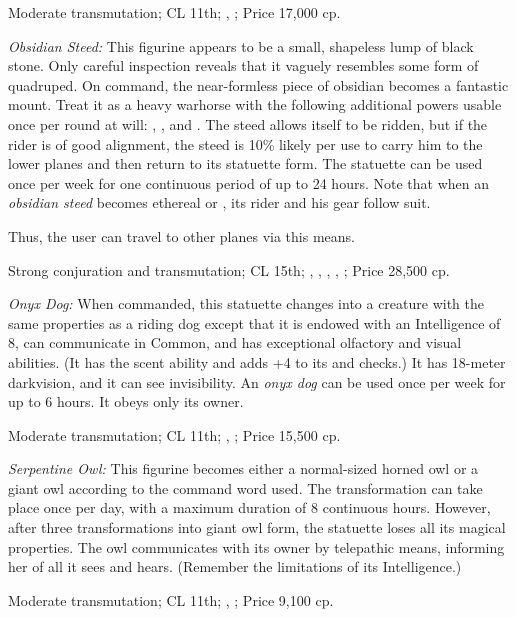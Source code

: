 Moderate transmutation; CL 11th; , ; Price 17,000 cp.

\textit{Obsidian Steed:} This figurine appears to be a small, shapeless lump of black stone. Only careful inspection reveals that it vaguely resembles some form of quadruped. On command, the near-formless piece of obsidian becomes a fantastic mount. Treat it as a heavy warhorse with the following additional powers usable once per round at will: , , and . The steed allows itself to be ridden, but if the rider is of good alignment, the steed is 10\% likely per use to carry him to the lower planes and then return to its statuette form. The statuette can be used once per week for one continuous period of up to 24 hours. Note that when an \emph{obsidian steed} becomes ethereal or , its rider and his gear follow suit.

Thus, the user can travel to other planes via this means.

Strong conjuration and transmutation; CL 15th; , , , , ; Price 28,500 cp.

\textit{Onyx Dog:} When commanded, this statuette changes into a creature with the same properties as a riding dog except that it is endowed with an Intelligence of 8, can communicate in Common, and has exceptional olfactory and visual abilities. (It has the scent ability and adds +4 to its  and  checks.) It has 18-meter darkvision, and it can see invisibility. An \emph{onyx dog} can be used once per week for up to 6 hours. It obeys only its owner.

Moderate transmutation; CL 11th; , ; Price 15,500 cp.

\textit{Serpentine Owl:} This figurine becomes either a normal-sized horned owl or a giant owl according to the command word used. The transformation can take place once per day, with a maximum duration of 8 continuous hours. However, after three transformations into giant owl form, the statuette loses all its magical properties. The owl communicates with its owner by telepathic means, informing her of all it sees and hears. (Remember the limitations of its Intelligence.)

Moderate transmutation; CL 11th; , ; Price 9,100 cp.

